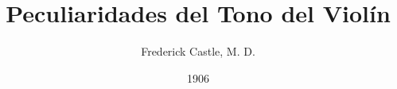 \usepackage[utf8]{inputenc}
\usepackage[spanish]{babel}
\usepackage{amsmath}
\usepackage{graphicx}
\usepackage{hyperref}
\usepackage{amssymb}
\usepackage{multicol}

\title{Peculiaridades del Tono del Violín}
\author{Frederick Castle, M. D.}
\date{1906}
